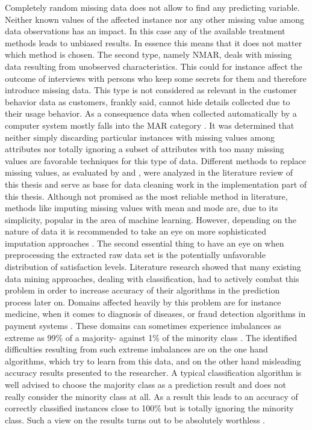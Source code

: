 Completely random missing data does not allow to find any predicting variable. Neither known values of the affected instance nor any other missing value among data observations has an impact. In this case any of the available treatment methods leads to unbiased results. In essence this means that it does not matter which method is chosen. The second type, namely NMAR, deals with missing data resulting from unobserved characteristics. This could for instance affect the outcome of interviews with persons who keep some secrets for them and therefore introduce missing data. This type is not considered as relevant in the customer behavior data as customers, frankly said, cannot hide details collected due to their usage behavior. As a consequence data when collected automatically by a computer system mostly falls into the MAR category \cite{donders2006gentle}. It was determined that neither simply discarding particular instances with missing values among attributes nor totally ignoring a subset of attributes with too many missing values are favorable techniques for this type of data. Different methods to replace missing values, as evaluated by \cite{donders2006gentle} and \cite{batista2003analysis}, were analyzed in the literature review of this thesis and serve as base for data cleaning work in the implementation part of this thesis. Although not promised as the most reliable method in literature, methods like imputing missing values with mean and mode are, due to its simplicity, popular in the area of machine learning. However, depending on the nature of data it is recommended to take an eye on more sophisticated imputation approaches \cite{batista2003analysis}. 
\newline
\newline
The second essential thing to have an eye on when preprocessing the extracted raw data set is the potentially unfavorable distribution of satisfaction levels. Literature research showed that many existing data mining approaches, dealing with classification, had to actively combat this problem in order to increase accuracy of their algorithms in the prediction process later on. Domains affected heavily by this problem are for instance medicine, when it comes to diagnosis of diseases, or fraud detection algorithms in payment systems \cite{chawla2004special}. These domains can sometimes experience imbalances as extreme as 99\% of a majority- against 1\% of the minority class \cite{he2009learning}. The identified difficulties resulting from such extreme imbalances are on the one hand algorithms, which try to learn from this data, and on the other hand misleading accuracy results presented to the researcher. A typical classification algorithm is well advised to choose the majority class as a prediction result and does not really consider the minority class at all. As a result this leads to an accuracy of correctly classified instances close to 100\% but is totally ignoring the minority class. Such a view on the results turns out to be absolutely worthless \cite{chawla2002smote} \cite{kubat1997addressing}. 
